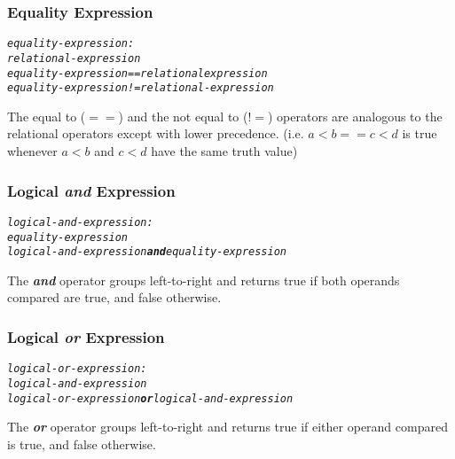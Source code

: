 \documentclass[12pt]{report}
\begin{document}
\subsubsection{Equality Expression}

\begin{alltt}\begin{singlespace}
         \textit{equality-expression:}
              \textit{relational-expression}
              \textit{equality-expression == relational expression}
              \textit{equality-expression != relational-expression}\end{singlespace}
\end{alltt}

The equal to ($==$) and the not equal to ($!$$=$) operators are analogous to the relational operators except with lower precedence. (i.e. $a<b == c<d$ is true whenever $a<b$ and $c<d$ have the same truth value)

\subsubsection{Logical \textit{and} Expression}

\begin{alltt}\begin{singlespace}
         \textit{logical-and-expression:}
              \textit{equality-expression}
              \textit{logical-and-expression \textbf{and} equality-expression}\end{singlespace}
\end{alltt}

The \textbf{\textit{and}} operator groups left-to-right and returns true if both operands compared are true, and false otherwise.

\subsubsection{Logical \textit{or} Expression}

\begin{alltt}\begin{singlespace}
         \textit{logical-or-expression:}
              \textit{logical-and-expression}
              \textit{logical-or-expression \textbf{or} logical-and-expression}\end{singlespace}
\end{alltt}

The \textbf{\textit{or}} operator groups left-to-right and returns true if either operand compared is true, and false otherwise.
\end{document}

